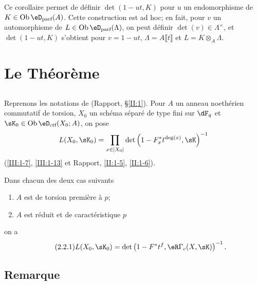 Ce corollaire permet de définir $\det(1-u t,K)$ pour $u$ un endomorphisme de 
$K\in \ob\eD_\text{parf}(A)$. Cette construction est ad hoc; en fait, pour $v$ un 
automorphisme de $L\in\ob\eD_\text{parf}(\Lambda)$, on peut définir 
$\det(v)\in\Lambda^\times$, et $\det(1-u t,K)$ s'obtient pour $v=1-u t$, 
$\Lambda=A\llbracket t\rrbracket$ et $L=K\otimes_A\Lambda$. 










\section{Le Théorème}\label{III:2}





\subsection{}\label{III:2-1}

Reprenons les notations de (Rapport, \S\ref{II:1}). Pour $A$ un anneau 
noethérien commutatif de torsion, $X_0$ un schéma séparé de type fini sur 
$\dF_q$ et $\sK_0\in\ob\eD_\text{ctf}(X_0;A)$, on pose 
\[
  L(X_0,\sK_0) = \prod_{x\in |X_0|} \det\left(1-F_x^* t^{\deg(x)}, \sK\right)^{-1}
\]
(\ref{III:1-7}, \ref{III:1-13} et Rapport, \ref{II:1-5}, \ref{II:1-6}). 





\begin{theorem_}\label{III:2-2}
Dans chacun des deux cas suivants
\begin{enumerate}[\indent a)]
  \item $A$ est de torsion première à $p$;
  \item $A$ est réduit et de caractéristique $p$
\end{enumerate}
on a 
\begin{equation*}\tag{2.2.1}\label{III:eq:2-2-1}
  L(X_0,\sK_0) = \det\left(1-F^* t^f, \eR\Gamma_c(X,\sK)\right)^{-1} \text{.}
\end{equation*}
\end{theorem_}





\subsection{Remarque}\label{III:2-3}

